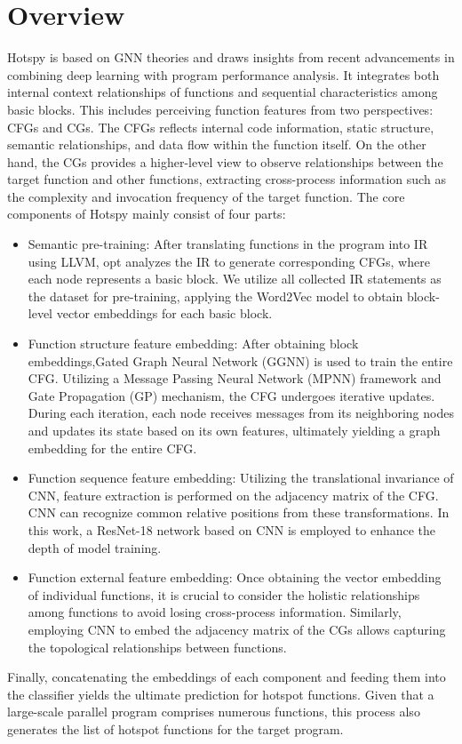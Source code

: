 \documentclass[lineno,sn-mathphys]{sn-jnl}%
\theoremstyle{thmstyleone}%
\theoremstyle{thmstyletwo}%
\theoremstyle{thmstylethree}%
\begin{document}
\section{Overview}
\label{sec:overview}
Hotspy is based on GNN theories and draws insights from recent advancements in combining deep learning with program performance analysis. It integrates both internal context relationships of functions and sequential characteristics among basic blocks. This includes perceiving function features from two perspectives: CFGs and CGs. The CFGs reflects internal code information, static structure, semantic relationships, and data flow within the function itself. On the other hand, the CGs provides a higher-level view to observe relationships between the target function and other functions, extracting cross-process information such as the complexity and invocation frequency of the target function.
The core components of Hotspy mainly consist of four parts:\par

\begin{itemize}
    \item Semantic pre-training: After translating functions in the program into IR using LLVM, opt analyzes the IR to generate corresponding CFGs, where each node represents a basic block. We utilize all collected IR statements as the dataset for pre-training, applying the Word2Vec model to obtain block-level vector embeddings for each basic block.
    \item Function structure feature embedding: After obtaining block embeddings,Gated Graph Neural Network (GGNN)  is used to train the entire CFG. Utilizing a Message Passing Neural Network (MPNN) framework and Gate Propagation (GP) mechanism, the CFG undergoes iterative updates. During each iteration, each node receives messages from its neighboring nodes and updates its state based on its own features, ultimately yielding a graph embedding for the entire CFG.
    \item Function sequence feature embedding: Utilizing the translational invariance of CNN, feature extraction is performed on the adjacency matrix of the CFG. CNN can recognize common relative positions from these transformations. In this work, a ResNet-18 network based on CNN is employed to enhance the depth of model training.
    \item Function external feature embedding: Once obtaining the vector embedding of individual functions, it is crucial to consider the holistic relationships among functions to avoid losing cross-process information. Similarly, employing CNN to embed the adjacency matrix of the CGs allows capturing the topological relationships between functions.
\end{itemize}
Finally, concatenating the embeddings of each component and feeding them into the classifier yields the ultimate prediction for hotspot functions. Given that a large-scale parallel program comprises numerous functions, this process also generates the list of hotspot functions for the target program.
\end{document}
